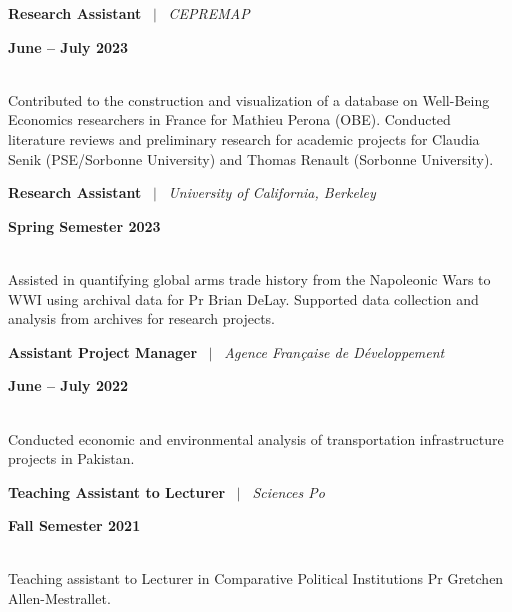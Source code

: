 \documentclass[a4paper,11pt]{article}
\begin{document}
\noindent
\begin{minipage}[t]{0.7\textwidth}
  \textbf{Research Assistant} \ $|$ \ \textit{CEPREMAP}
\end{minipage}%
\begin{minipage}[t]{0.3\textwidth}
  \raggedleft \textbf{June -- July 2023}
\end{minipage}
\\
Contributed to the construction and visualization of a database on Well-Being Economics researchers in France for Mathieu Perona (OBE). Conducted literature reviews and preliminary research for academic projects for Claudia Senik (PSE/Sorbonne University) and Thomas Renault (Sorbonne University).

\noindent
\begin{minipage}[t]{0.7\textwidth}
  \textbf{Research Assistant} \ $|$ \ \textit{University of California, Berkeley}
\end{minipage}%
\begin{minipage}[t]{0.3\textwidth}
  \raggedleft \textbf{Spring Semester 2023}
\end{minipage}
\\
Assisted in quantifying global arms trade history from the Napoleonic Wars to WWI using archival data for  Pr Brian DeLay. Supported data collection and analysis from archives for research projects.

\noindent
\begin{minipage}[t]{0.7\textwidth}
  \textbf{Assistant Project Manager} \ $|$ \ \textit{Agence Française de Développement}
\end{minipage}%
\begin{minipage}[t]{0.3\textwidth}
  \raggedleft \textbf{June -- July 2022}
\end{minipage}
\\
Conducted economic and environmental analysis of transportation infrastructure projects in Pakistan.

\noindent
\begin{minipage}[t]{0.7\textwidth}
  \textbf{Teaching Assistant to Lecturer} \ $|$ \ \textit{Sciences Po}
\end{minipage}
\begin{minipage}[t]{0.3\textwidth}
  \raggedleft \textbf{Fall Semester 2021}
\end{minipage}
\\
Teaching assistant to Lecturer in Comparative Political Institutions Pr Gretchen Allen-Mestrallet.
\end{document}
